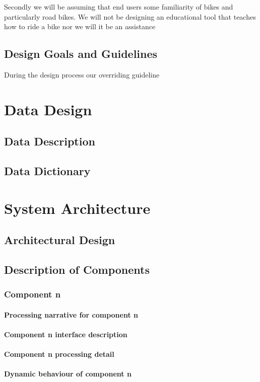 \documentclass[]{report}
\begin{document}
Secondly we will be assuming that end users some familiarity of bikes and particularly road bikes. We will not be designing an educational tool that teaches how to ride a bike nor we will it be an assistance 
\section{Design Goals and Guidelines}
During the design process our overriding guideline

\chapter{Data Design}
\section{Data Description}
\section{Data Dictionary}

\chapter{System Architecture}
\section{Architectural Design}
\section{Description of Components}
\subsection{Component n}
\subsubsection{Processing narrative for component n}
\subsubsection{Component n interface description}
\subsubsection{Component n processing detail}
\subsubsection{Dynamic behaviour of component n}
\end{document}
